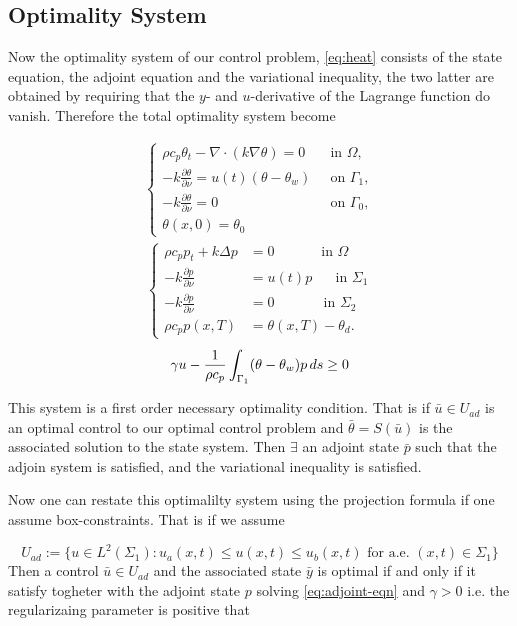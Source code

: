 \subsection{Optimality System}
Now the optimality system of our control problem, \eqref{eq:heat} consists of the state equation, the adjoint equation and the variational inequality, the two latter are obtained by requiring that the $y$- and $u$-derivative of the Lagrange function do vanish. Therefore the total optimality system become

\begin{align*}
    \begin{cases}
     \rho c_p \theta_t - \nabla \cdot (k \nabla \theta) = 0 \quad & \text{in $\Omega$}, \\
      -k \frac{\partial \theta}{\partial \nu} = u(t) (\theta - \theta_w) &\text{on } \Gamma_1, \\
      -k \frac{\partial \theta}{\partial \nu} = 0  &\text{on } \Gamma_0, \\
      \theta(x, 0) = \theta_0 
      \end{cases}
      \end{align*}
      \begin{align*}
      \begin{cases}
       \rho c_p p_t + k\Delta p &= 0 \quad\qquad\textrm{ in } \Omega \\
      -k\frac{\partial p}{\partial\nu} &= u(t)p \,\,\quad\textrm{ in } \Sigma_1 \\
      -k\frac{\partial p}{\partial\nu} &= 0 \,\quad\qquad\textrm{ in } \Sigma_2 \\
      \rho c_p p(x, T) &= \theta(x, T) - \theta_d.
      \end{cases}
      \end{align*}
\begin{equation*}
      \gamma u - \frac{1}{\rho c_p} \int_{\Gamma_1} (\theta - \theta_w)p \mathop{ds} \geq 0
\end{equation*}

This system is a first order necessary optimality condition. That is if $\bar{u} \in U_{ad}$ is an optimal control to our optimal control problem and $\bar{\theta} = S(\bar{u})$ is the associated solution to the state system. Then $\exists$ an adjoint state $\bar{p}$ such that the adjoin system is satisfied, and the variational inequality is satisfied. 

Now one can restate this optimalilty system using the projection formula if one assume box-constraints. That is if we assume

\begin{equation}
    \label{eq:box_constraints}
    U_{ad} := \{ u \in L^2(\Sigma_1): u_a(x,t) \leq u(x,t) \leq u_b(x,t) \text{ for a.e. } (x,t) \in \Sigma_1 \}
\end{equation}
Then a control $\bar{u} \in U_{ad}$ and the associated state $\bar{y}$ is optimal if and only if it satisfy togheter with the adjoint state $p$ solving \eqref{eq:adjoint-eqn}  and $\gamma >0$ i.e. the regularizaing parameter is positive that
